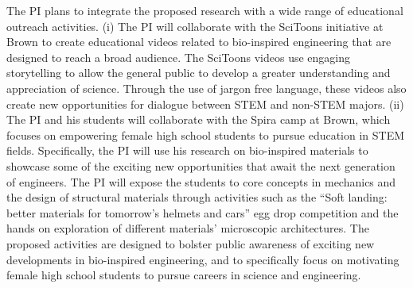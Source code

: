 \documentclass[10pt,letterpaper]{article}
\begin{document}
The PI plans to integrate the proposed research with a wide range of educational outreach activities. (i) The PI will collaborate with the SciToons initiative at Brown to create educational videos related to bio-inspired engineering that are designed to reach a broad audience. The SciToons videos use engaging storytelling to allow the general public to develop a greater understanding and appreciation of science. Through the use of jargon free language, these videos also create new opportunities for dialogue between STEM and non-STEM majors. (ii) The PI and his students will collaborate with the Spira camp at Brown, which focuses on empowering female high school students to pursue education in STEM fields. Specifically, the PI will use his research on bio-inspired materials to showcase some of the exciting new opportunities that await the next generation of engineers. The PI will expose the students to core concepts in mechanics and the design of structural materials through activities such as the ``Soft landing: better materials for tomorrow's helmets and cars'' egg drop competition and the hands on exploration of different materials' microscopic architectures. The proposed activities are designed to bolster public awareness of exciting new developments in bio-inspired engineering, and to specifically focus on motivating female high school students to pursue careers in science and engineering.
\end{document}
